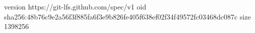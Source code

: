 version https://git-lfs.github.com/spec/v1
oid sha256:48b76c9e2a56f3f885fa6f3e9b826fe405f638ef02f34f49572fc03468dc087c
size 1398256
